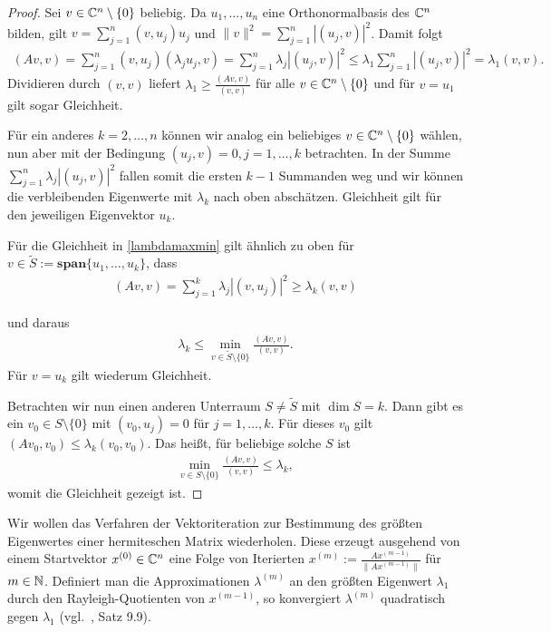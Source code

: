 \documentclass{article}
\theoremstyle{plain}
\begin{document}
\begin{proof}
	Sei $v \in \mathbb{C}^n \setminus \{0\}$ beliebig. Da $u_1, \dots, u_n$ eine Orthonormalbasis des $\mathbb{C}^n$ bilden, gilt $ v = \sum_{j=1}^{n} (v,u_j) u_j$ und $\|v\|^2 = \sum_{j=1}^{n} |(u_j,v)|^2$. Damit folgt
	\begin{align*}
		(Av,v) = \sum_{j=1}^{n} (v,u_j) (\lambda_j u_j,v) = \sum_{j=1}^{n} \lambda_j |(u_j,v)|^2 \leq \lambda_1 \sum_{j=1}^{n} |(u_j,v)|^2 = \lambda_1 (v,v).
	\end{align*}
	Dividieren durch $(v,v)$ liefert $\lambda_1 \geq \frac{(Av,v)}{(v,v)}$ für alle $v \in \mathbb{C}^n \setminus \{0\}$ und für $v = u_1$ gilt sogar Gleichheit.

	Für ein anderes $k = 2,\dots,n$ können wir analog ein beliebiges $v \in \mathbb{C}^n \setminus \{0\}$ wählen, nun aber mit der Bedingung $(u_j,v) = 0, j=1,\dots,k$ betrachten. In der Summe $\sum_{j=1}^{n} \lambda_j |(u_j,v)|^2$ fallen somit die ersten $k-1$ Summanden weg und wir können die verbleibenden Eigenwerte mit $\lambda_k$ nach oben abschätzen. Gleichheit gilt für den jeweiligen Eigenvektor $u_k$.

	Für die Gleichheit in \eqref{lambdamaxmin} gilt ähnlich zu oben für $v \in \tilde{S} := \textbf{span}\{u_1, \dots, u_k\}$, dass
	\begin{align*}
		(Av,v) = \sum_{j=1}^{k} \lambda_j |(v,u_j)|^2 \geq \lambda_k (v,v)
	\end{align*}

	und daraus
	\begin{align*}
		\lambda_k \leq \min_{v \in \tilde{S} \setminus \{0\}} \frac{(Av,v)}{(v,v)}.
	\end{align*}
	Für $v = u_k$ gilt wiederum Gleichheit.

	Betrachten wir nun einen anderen Unterraum $S \neq \tilde{S}$ mit $\dim S = k$. Dann gibt es ein $v_0 \in S \setminus \{0\}$ mit $(v_0,u_j) = 0$ für $j=1,\dots,k$. Für dieses $v_0$ gilt $(Av_0,v_0) \leq \lambda_k (v_0,v_0)$. Das heißt, für beliebige solche $S$ ist
	\begin{align*}
		\min_{v \in S \setminus \{0\}} \frac{(Av,v)}{(v,v)} \leq \lambda_k,
	\end{align*}
	womit die Gleichheit gezeigt ist.
\end{proof}

Wir wollen das Verfahren der Vektoriteration zur Bestimmung des größten Eigenwertes einer hermiteschen Matrix wiederholen. Diese erzeugt ausgehend von einem Startvektor $x^{(0)} \in \mathbb{C}^{n}$ eine Folge von Iterierten $x^{(m)} := \frac{Ax^{(m-1)}}{\|Ax^{(m-1)}\|}$ für $m \in \mathbb{N}$. Definiert man die Approximationen $\lambda^{(m)}$ an den größten Eigenwert $\lambda_1$ durch den Rayleigh-Quotienten von $x^{(m-1)}$, so konvergiert $\lambda^{(m)}$ quadratisch gegen $\lambda_1$ (vgl.\ \cite{Num}, Satz 9.9).
\end{document}
